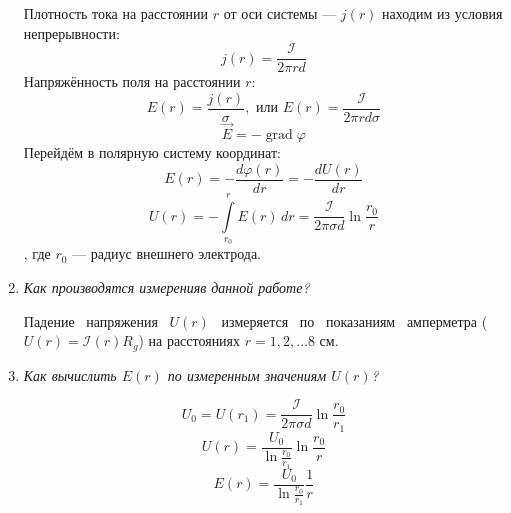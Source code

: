 \documentclass[a4paper,10pt]{article}
\begin{document}
\begin{enumerate}
Плотность тока на расстоянии $r$ от оси системы --- $j\left(r\right)$ находим из условия непрерывности:
$$j\left(r\right) = \frac{\mathcal I}{2\pi r d}$$
Напряжённость поля на расстоянии $r$:
$$E\left(r\right)=\frac{j\left(r\right)}{\sigma}, \text{ или  } E\left(r\right) = \frac{\mathcal I}{2\pi r d\sigma}$$
$$\vec{E} = -\mathop{grad}\varphi$$
Перейдём в полярную систему координат:
$$E\left(r\right) = -\frac{d\varphi\left(r\right)}{dr} = -\frac{dU\left(r\right)}{dr}$$
$$U\left(r\right) = -\int\limits_{r_0}^r E\left(r\right)\,dr = \frac{\mathcal I}{2\pi\sigma d}\ln\frac{r_0}{r}$$
, где $r_0$ --- радиус внешнего электрода.
\item \textit{Как производятся измеренияв данной работе?}

Падение ~напряжения ~$U\left(r\right)$ ~измеряется ~по ~показаниям ~амперметра ($U\left(r\right) = \mathcal{I}\left(r\right)R_g$)
на расстояниях $r = 1, 2,\dots 8$ см.
\item \textit{Как вычислить $E\left(r\right)$ по измеренным значениям $U\left(r\right)$?}

$$U_0 = U\left(r_1\right) = \frac{\mathcal I}{2\pi\sigma d}\ln\frac{r_0}{r_1}$$
$$U\left(r\right) = \frac{U_0}{\ln\frac{r_0}{r_1}}\ln\frac{r_0}{r}$$
$$E\left(r\right) = \frac{U_0}{\ln\frac{r_0}{r_1}}\frac1r$$
\end{enumerate}
\end{document}
